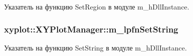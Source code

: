 Указатель на функцию Set\-Region в модуле m\-\_\-h\-Dll\-Instance. 

\hypertarget{group__gr_func_pointers_ga94e766d64a4b9d8d435702a2244540b6}{
\subsubsection[{m\-\_\-lpfn\-Set\-String}]{ xyplot\-::\-X\-Y\-Plot\-Manager\-::m\-\_\-lpfn\-Set\-String\hspace{0.3cm}{\ttfamily [protected]}}}\label{group__gr_func_pointers_ga94e766d64a4b9d8d435702a2244540b6}


Указатель на функцию Set\-String в модуле m\-\_\-h\-Dll\-Instance. 

